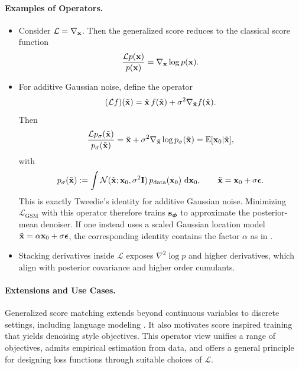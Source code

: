 \paragraph{Examples of Operators.}
\begin{itemize}
\item {} Consider $\mathcal L = \nabla_{{\mathbf{x}}}$. 
Then the generalized score reduces to the classical score function
\[
\frac{\mathcal L p({\mathbf{x}})}{p({\mathbf{x}})}
= \nabla_{{\mathbf{x}}}\log p({\mathbf{x}}).
\]
\item {}
For additive Gaussian noise, define the operator
\[
(\mathcal L f)(\tilde{{\mathbf{x}}})
= \tilde{{\mathbf{x}}}\,f(\tilde{{\mathbf{x}}}) + \sigma^2\nabla_{\tilde{{\mathbf{x}}}} f(\tilde{{\mathbf{x}}}).
\]
Then
\[
\frac{\mathcal L p_\sigma(\tilde{{\mathbf{x}}})}{p_\sigma(\tilde{{\mathbf{x}}})}
= \tilde{{\mathbf{x}}} + \sigma^2\nabla_{\tilde{{\mathbf{x}}}}\log p_\sigma(\tilde{{\mathbf{x}}})
= \mathbb E[{\mathbf{x}}_0|\tilde{{\mathbf{x}}}],
\]
with
\[
p_\sigma(\tilde{{\mathbf{x}}})
:=
\int
\mathcal{N}(\tilde{{\mathbf{x}}};{\mathbf{x}}_0,\sigma^2{\mathbf{I}})
\,p_{\mathrm{data}}({\mathbf{x}}_0)\,\mathop{}\!\mathrm{d}{\mathbf{x}}_0,
\qquad
\tilde{{\mathbf{x}}}={\mathbf{x}}_0+\sigma{\bm{\epsilon}}.
\]
This is exactly Tweedie's identity for additive Gaussian noise. Minimizing
$\mathcal{L}_{\mathrm{GSM}}$ with this operator therefore trains
${\mathbf{s}}_{{\bm{\phi}}}$ to approximate the posterior-mean denoiser. If one instead uses
a scaled Gaussian location model
$\tilde{{\mathbf{x}}}=\alpha{\mathbf{x}}_0+\sigma{\bm{\epsilon}}$, the corresponding identity contains the
factor $\alpha$ as in .



\item {}
Stacking derivatives inside $\mathcal L$ exposes $\nabla^2\log p$ and higher derivatives, which align with posterior covariance and higher order cumulants.
\end{itemize}


\paragraph{Extensions and Use Cases.}
Generalized score matching extends beyond continuous variables to discrete settings, including language modeling \citep{meng2022concrete,lou2024discrete}. It also motivates score inspired training that yields denoising style objectives. This operator view unifies a range of objectives, admits empirical estimation from data, and offers a general principle for designing loss functions through suitable choices of $\mathcal L$.





